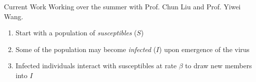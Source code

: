 \begin{slide}{Current Work}
	Working over the summer with Prof. Chun Liu and Prof. Yiwei Wang. \\
	
	\begin{enumerate}
		\item Start with a population of \emph{susceptibles} ($S$)
		\item Some of the population may become \emph{infected} ($I$) upon emergence of the virus
		\item Infected individuals interact with susceptibles at rate $\beta$ to draw new members into $I$
	\end{enumerate}
\end{slide}
